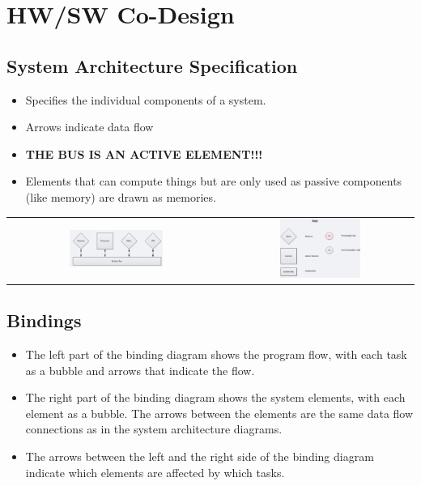 \section{HW/SW Co-Design }
	\subsection{System Architecture Specification}
	
		\begin{itemize}
		  \item Specifies the individual components of a system.
		  \item Arrows indicate data flow
		  \item {\color{red}\textbf{THE BUS IS AN ACTIVE ELEMENT!!!}}
		  \item Elements that can compute things but are only used as passive components (like memory) are drawn as memories.
		\end{itemize}
		
		\begin{table}[H]
			\begin{tabular}{cc}
				\includegraphics[width=0.45\textwidth]{./pictures/systemArchDiagram.png}
					& \includegraphics[width=0.45\textwidth]{./pictures/systemArchKey.png}
			\end{tabular}
		\end{table}
		
	\subsection{Bindings}
		\begin{itemize}
		  \item The left part of the binding diagram shows the program flow, with each task as a bubble and arrows that indicate the flow. 
		  \item The right part of the binding diagram shows the system elements, with each element as a bubble. The arrows between the elements are the same data flow connections as in the system architecture diagrams.
		  \item The arrows between the left and the right side of the binding diagram indicate which elements are affected by which tasks.
		\end{itemize}
		
